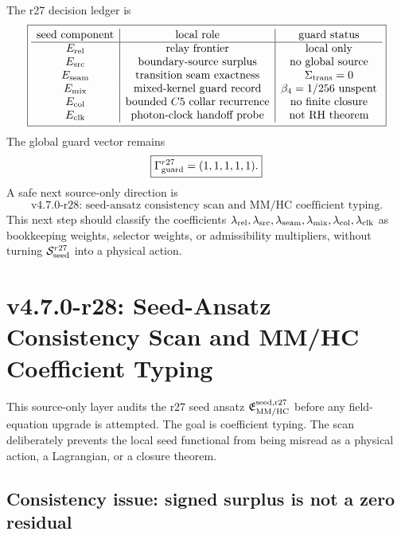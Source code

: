 The r27 decision ledger is
\[
\boxed{
\begin{array}{c|c|c}
\text{seed component} & \text{local role} & \text{guard status}\\
\hline
E_{\rm rel} & \text{relay frontier} & \text{local only}\\
E_{\rm src} & \text{boundary-source surplus} & \text{no global source}\\
E_{\rm seam} & \text{transition seam exactness} & \Sigma_{\rm trans}=0\\
E_{\rm mix} & \text{mixed-kernel guard record} & \beta_4=1/256\text{ unspent}\\
E_{\rm col} & \text{bounded }C5\text{ collar recurrence} & \text{no finite closure}\\
E_{\rm clk} & \text{photon-clock handoff probe} & \text{not RH theorem}
\end{array}
}
\]
The global guard vector remains
\[
\boxed{
\Gamma_{\rm guard}^{r27}=(1,1,1,1,1).
}
\]
A safe next source-only direction is
\[
\boxed{
\text{v4.7.0-r28: seed-ansatz consistency scan and MM/HC coefficient typing.}
}
\]
This next step should classify the coefficients
\(\lambda_{\rm rel},\lambda_{\rm src},\lambda_{\rm seam},\lambda_{\rm mix},
\lambda_{\rm col},\lambda_{\rm clk}\) as bookkeeping weights, selector weights,
or admissibility multipliers, without turning \(\mathcal S_{\rm seed}^{r27}\)
into a physical action.




\section{v4.7.0-r28: Seed-Ansatz Consistency Scan and MM/HC Coefficient Typing}
\label{sec:v470-r28-seed-consistency-coefficient-typing}

This source-only layer audits the r27 seed ansatz
\(\mathfrak E_{\rm MM/HC}^{\rm seed,r27}\) before any field-equation upgrade is
attempted.  The goal is coefficient typing.  The scan deliberately prevents the
local seed functional from being misread as a physical action, a Lagrangian, or a
closure theorem.

\subsection{Consistency issue: signed surplus is not a zero residual}
\label{subsec:v470-r28-signed-surplus-not-zero-residual}

